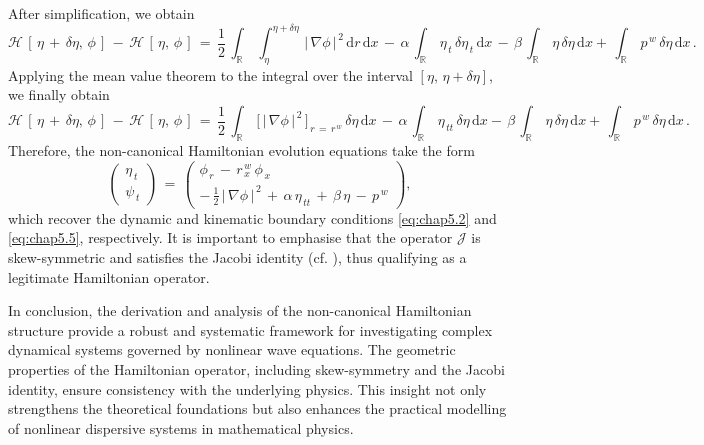 \documentclass[alpha-refs, 12pt]{wiley-article}
\begin{document}
After simplification, we obtain
\begin{equation*}
  \mathcal{H}\,[\,\eta\,+\,\delta\eta,\,\phi\,]\,-\,\mathcal{H}\,[\,\eta,\,\phi\,]
  \,=\,\frac{1}{2}\,\int_{\mathbb{R}}\,\int_{\eta}^{\eta+\delta\eta}\,|\,\nabla\phi\,|^{\,2}\,\mathrm{d}r\,\mathrm{d}x\,-\,\alpha\,\int_{\mathbb{R}}\,\eta_{\,t}\,\delta\eta_{\,t}\,\mathrm{d}x\,-\,\beta\,\int_{\mathbb{R}}\,\eta\,\delta\eta\,\mathrm{d}x
  +\,\int_{\mathbb{R}}\,p^{\,w}\,\delta\eta\,\mathrm{d}x\,.
\end{equation*}
Applying the mean value theorem to the integral over the interval $[\eta,\,\eta+\delta\eta]$, we finally obtain
\begin{equation*}
  \mathcal{H}\,[\,\eta\,+\,\delta\eta,\,\phi\,]\,-\,\mathcal{H}\,[\,\eta,\,\phi\,]
  \,=\,\frac{1}{2}\,\int_{\mathbb{R}}\,\bigl[\,|\,\nabla\phi\,|^{\,2}\,\bigr]_{\,r\,=\,r^{\,w}}\,\delta\eta\,\mathrm{d}x\,-\,\alpha\,\int_{\mathbb{R}}\,\eta_{\,tt}\,\delta\eta\,\mathrm{d}x
  -\,\beta\,\int_{\mathbb{R}}\,\eta\,\delta\eta\,\mathrm{d}x
  +\,\int_{\mathbb{R}}\,p^{\,w}\,\delta\eta\,\mathrm{d}x\,.
\end{equation*}
Therefore, the non-canonical Hamiltonian evolution equations take the form
\begin{equation}
  \begin{pmatrix}
    \eta_{\,t} \\
    \psi_{\,t}
  \end{pmatrix}
  \,=\,\begin{pmatrix}
    \phi_{\,r}\,-\,r^{\,w}_{\,x}\,\phi_{\,x} \\
    -\,\frac{1}{2}\,|\,\nabla\phi\,|^{\,2}\,+\,\alpha\,\eta_{\,tt}\,+\,\beta\,\eta\,-\,p^{\,w}
  \end{pmatrix},
\end{equation}
which recover the dynamic and kinematic boundary conditions \eqref{eq:chap5.2} and \eqref{eq:chap5.5}, respectively. It is important to emphasise that the operator $\mathcal{J}$ is skew-symmetric and satisfies the Jacobi identity (cf. \cite{Nutku1987}), thus qualifying as a legitimate Hamiltonian operator.

In conclusion, the derivation and analysis of the non-canonical Hamiltonian structure provide a robust and systematic framework for investigating complex dynamical systems governed by nonlinear wave equations. The geometric properties of the Hamiltonian operator, including skew-symmetry and the Jacobi identity, ensure consistency with the underlying physics. This insight not only strengthens the theoretical foundations but also enhances the practical modelling of nonlinear dispersive systems in mathematical physics.
\end{document}
